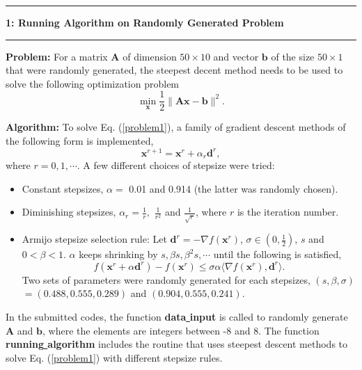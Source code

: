\documentclass[11pt]{article}
\newcommand\question[2]{\vspace{.25in}\hrule\textbf{#1: #2}\vspace{.5em}\hrule\vspace{.10in}}
\newcommand\problem{\vspace{.10in}\textbf{Problem: }}
\newcommand\algorithm{\vspace{.10in}\textbf{Algorithm: }}
\begin{document}
\raggedright

\newcommand\NAME{Chan-Ching Hsu}  %

\justify
\question{1}{Running Algorithm on Randomly Generated Problem}

\problem For a matrix $\mathbf{A}$ of dimension $50\times10$ and vector $\mathbf{b}$ of the size $50\times1$ that were randomly generated, the steepest decent method needs to be used to solve the following optimization problem
\begin{equation}\label{problem1}
\min_\mathbf{x}\frac{1}{2}\|\mathbf{Ax-b}\|^2.
\end{equation}

\algorithm To solve Eq. (\ref{problem1}), a family of gradient descent methods of the following form is implemented,
\begin{equation*}
    \mathbf{x}^{r+1}=\mathbf{x}^r+\alpha_r\mathbf{d}^r,
\end{equation*}
where $r=0,1,\cdots$.
A few different choices of stepsize were tried:
\begin{itemize}
  \item Constant stepsizes, $\alpha=$ 0.01 and 0.914 (the latter was randomly chosen).
  \item Diminishing stepsizes, $\alpha_r=\frac{1}{r},$ $\frac{1}{r^2}$ and $\frac{1}{\sqrt{r}}$, where $r$ is the iteration number.
  \item Armijo stepsize selection rule: Let $\mathbf{d}^r=-\nabla f(\mathbf{x}^r)$, $\sigma\in(0,\frac{1}{2})$, $s$ and $0<\beta<1$. $\alpha$ keeps shrinking by $s,\beta s,\beta^2s,\cdots$ until the following is satisfied,
        \begin{equation*}
            f(\mathbf{x}^r+\alpha\mathbf{d}^r)-f(\mathbf{x}^r)\leq\sigma\alpha\langle\nabla f(\mathbf{x}^r),\mathbf{d}^r\rangle.
        \end{equation*}
      Two sets of parameters were randomly generated for each stepsizes, $(s,\beta,\sigma)$$=$$(0.488,0.555,0.289)$ and $(0.904,0.555,0.241)$.
\end{itemize}
In the submitted codes, the function \textbf{data\underline{ }input} is called to randomly generate $\mathbf{A}$ and $\mathbf{b}$, where the elements are integers between -8 and 8. The function \textbf{running\underline{ }algorithm} includes the routine that uses steepest descent methods to solve Eq. (\ref{problem1}) with different stepsize rules.
\end{document}
